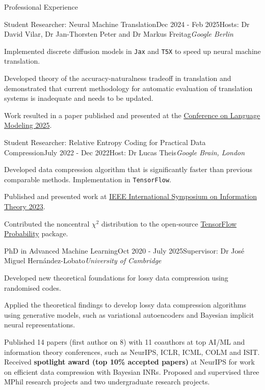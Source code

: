 \documentclass{resume} %
\begin{document}
\begin{rSection}{Professional Experience}
\begin{rSubsection}{Student Researcher: Neural Machine Translation}{Dec
      2024 - Feb 2025}{Hosts: Dr David Vilar, Dr Jan-Thorsten
    Peter and Dr Markus Freitag}{\textit{Google Berlin}}
\item Implemented discrete diffusion models in \texttt{Jax} and \texttt{T5X} to speed up neural machine translation.
\item Developed theory of the accuracy-naturalness tradeoff in translation and
 demonstrated that current methodology for automatic evaluation of
  translation systems is inadequate and needs to be updated.
\item Work resulted in a paper published and presented at
  the \href{https://openreview.net/forum?id=d9EkgbZZH9}{Conference on Language Modeling 2025}.
\end{rSubsection}

\begin{rSubsection}{Student Researcher: Relative Entropy Coding for Practical Data Compression}{July
      2022 - Dec 2022}{Host: Dr Lucas Theis}{\textit{Google Brain, London}}
\item Developed data compression algorithm that is significantly
  faster than previous comparable methods. Implementation in \texttt{TensorFlow}.
\item Published and presented work at
  \href{https://ieeexplore.ieee.org/document/10206725}{IEEE International
    Symposium on Information Theory 2023}.
\item Contributed the noncentral $\chi^2$ distribution to
  the open-source \href{https://www.tensorflow.org/probability}{TensorFlow Probability} package.
\end{rSubsection}

\begin{rSubsection}{PhD in Advanced Machine Learning}{Oct 2020 - July 2025}{Supervisor: Dr Jos\'e Miguel Hern\'andez-Lobato}{\textit{University of Cambridge}}
\item Developed new theoretical foundations for lossy data compression using
  randomised codes.
\item Applied the theoretical findings to develop lossy data compression
  algorithms using generative models, such as variational autoencoders and
  Bayesian implicit neural representations.
\item Published 14 papers (first author on 8) with 11 coauthors at top AI/ML and information theory
  conferences, such as NeurIPS, ICLR, ICML, COLM and ISIT.
  Received \textbf{spotlight award (top 10\% accepted papers)} at NeurIPS for work on
  efficient data compression with Bayesian INRs.
  Proposed and supervised three MPhil research projects and two undergraduate
  research projects.
\end{rSubsection}


\end{rSection}
\end{document}
